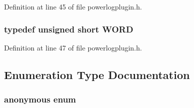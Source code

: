 \-Definition at line 45 of file powerlogplugin.\-h.

\hypertarget{group__powerlogplugin_ga197942eefa7db30960ae396d68339b97}{
\subsubsection[{\-W\-O\-R\-D}]{\setlength{\rightskip}{0pt plus 5cm}typedef unsigned short {\bf \-W\-O\-R\-D}}}\label{group__powerlogplugin_ga197942eefa7db30960ae396d68339b97}


\-Definition at line 47 of file powerlogplugin.\-h.



\subsection{\-Enumeration \-Type \-Documentation}
\hypertarget{group__powerlogplugin_ga7ff5f2dff38e7639981794c43dc9167b}{\subsubsection[{anonymous enum}]{\setlength{\rightskip}{0pt plus 5cm}anonymous enum}}\label{group__powerlogplugin_ga7ff5f2dff38e7639981794c43dc9167b}
